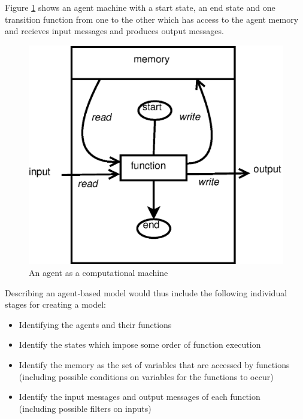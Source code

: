 Figure \ref{fig:xmachine} shows an agent machine with a start state, 
an end state and one transition function from one to the other which has access to the 
agent memory and recieves input messages and produces output messages.

\begin{figure}[ht]
\begin{center}
\includegraphics*[scale=0.5]{xmachine.eps}
\caption{An agent as a computational machine}
\label{fig:xmachine}
\end{center}
\end{figure}



\clearpage

Describing an agent-based model would thus include the following individual
stages for creating a model:

\begin{itemize}
\item Identifying the agents and their functions
\item Identify the states which impose some order of function execution
\item Identify the memory as the set of variables that are accessed by
functions \\(including possible conditions on variables for the functions to
occur)
\item Identify the input messages and output messages of each function 
\\(including possible filters on inputs)

\end{itemize}

